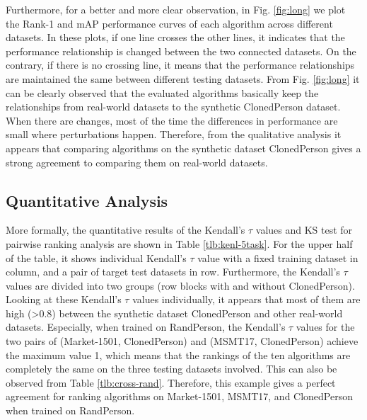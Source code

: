 \documentclass[10pt,twocolumn,letterpaper]{article}
\begin{document}
Furthermore, for a better and more clear observation, in Fig. \ref{fig:long} we plot the Rank-1 and mAP performance curves of each algorithm across different datasets. In these plots, if one line crosses the other lines, it indicates that the performance relationship is changed between the two connected datasets. On the contrary, if there is no crossing line, it means that the performance relationships are maintained the same between different testing datasets. From Fig. \ref{fig:long} it can be clearly observed that the evaluated algorithms basically keep the relationships from real-world datasets to the synthetic ClonedPerson dataset. When there are changes, most of the time the differences in performance are small where perturbations happen. Therefore, from the qualitative analysis it appears that comparing algorithms on the synthetic dataset ClonedPerson gives a strong agreement to comparing them on real-world datasets.



\subsection{Quantitative Analysis} 

More formally, the quantitative results of the Kendall's $\tau$ values and KS test for pairwise ranking analysis are shown in Table \ref{tlb:kenl-5task}. For the upper half of the table, it shows individual Kendall's $\tau$ value with a fixed training dataset in column, and a pair of target test datasets in row. Furthermore, the Kendall's $\tau$ values are divided into two groups (row blocks with and without ClonedPerson). Looking at these Kendall's $\tau$ values individually, it appears that most of them are high (>0.8) between the synthetic dataset ClonedPerson and other real-world datasets. Especially, when trained on RandPerson, the Kendall's $\tau$ values for the two pairs of (Market-1501, ClonedPerson) and (MSMT17, ClonedPerson) achieve the maximum value 1, which means that the rankings of the ten algorithms are completely the same on the three testing datasets involved. This can also be observed from Table \ref{tlb:cross-rand}. Therefore, this example gives a perfect agreement for ranking algorithms on Market-1501, MSMT17, and ClonedPerson when trained on RandPerson.
\end{document}
